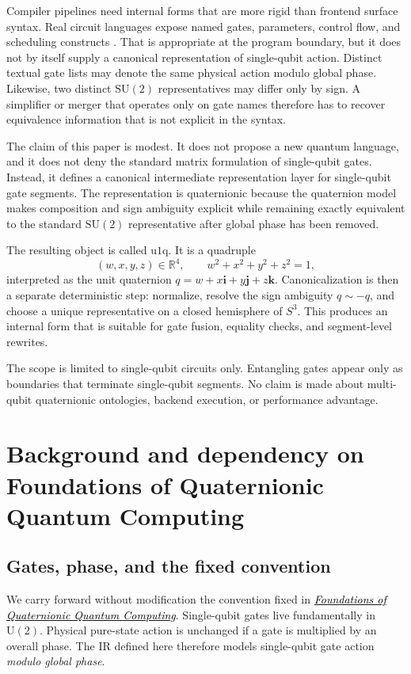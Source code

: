 \documentclass[11pt]{article}
\theoremstyle{remark}
\newcommand{\R}{\mathbb{R}}
\newcommand{\SU}{\mathrm{SU}}
\newcommand{\U}{\mathrm{U}}
\newcommand{\ii}{\mathbf{i}}
\newcommand{\jj}{\mathbf{j}}
\newcommand{\kk}{\mathbf{k}}
\newcommand{\uoneq}{\mathrm{u1q}}
\newcommand{\foundationstitle}{\href{../qqc-001-foundations/paper.pdf}{\textcolor{black}{\emph{Foundations of Quaternionic Quantum Computing}}}}
\begin{document}
Compiler pipelines need internal forms that are more rigid than frontend
surface syntax. Real circuit languages expose named gates, parameters, control
flow, and scheduling constructs \citep{cross2022,smith2016}. That is
appropriate at the program boundary, but it does not by itself supply a
canonical representation of single-qubit action. Distinct textual gate lists may
denote the same physical action modulo global phase. Likewise, two distinct
$\SU(2)$ representatives may differ only by sign. A simplifier or merger that
operates only on gate names therefore has to recover equivalence information
that is not explicit in the syntax.

The claim of this paper is modest. It does not propose a new quantum language,
and it does not deny the standard matrix formulation of single-qubit gates.
Instead, it defines a canonical intermediate representation layer for
single-qubit gate segments. The representation is quaternionic because the
quaternion model makes composition and sign ambiguity explicit while remaining
exactly equivalent to the standard $\SU(2)$ representative after global phase
has been removed.

The resulting object is called $\uoneq$. It is a quadruple
\[
(w,x,y,z)\in\R^4,\qquad w^2+x^2+y^2+z^2=1,
\]
interpreted as the unit quaternion $q=w+x\ii+y\jj+z\kk$. Canonicalization is
then a separate deterministic step: normalize, resolve the sign ambiguity
$q\sim -q$, and choose a unique representative on a closed hemisphere of $S^3$.
This produces an internal form that is suitable for gate fusion, equality
checks, and segment-level rewrites.

The scope is limited to single-qubit circuits only. Entangling gates appear
only as boundaries that terminate single-qubit segments. No claim is made about
multi-qubit quaternionic ontologies, backend execution, or performance
advantage.

\section{Background and dependency on Foundations of Quaternionic Quantum Computing}

\subsection{Gates, phase, and the fixed convention}

We carry forward without modification the convention fixed in
\foundationstitle. Single-qubit gates live fundamentally in
$\U(2)$. Physical pure-state action is unchanged if a gate is multiplied by an
overall phase. The IR defined here therefore models single-qubit gate action
\emph{modulo global phase}.
\end{document}
